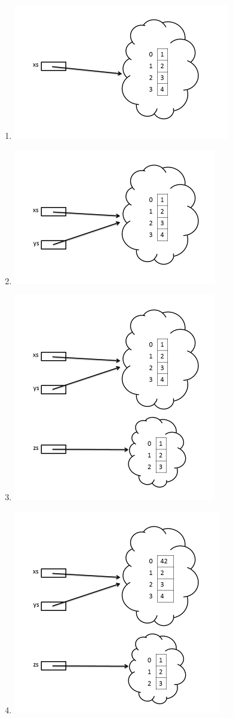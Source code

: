 \SubtaskSolved  \begin{enumerate}
\item \includegraphics[scale=1.2]{../img/w05-solutions/memory-pic-2}
\item \includegraphics[scale=1.2]{../img/w05-solutions/memory-pic-3}
\item \includegraphics[scale=1.2]{../img/w05-solutions/memory-pic-4}
\item \includegraphics[scale=1.2]{../img/w05-solutions/memory-pic-5}

\end{enumerate}
